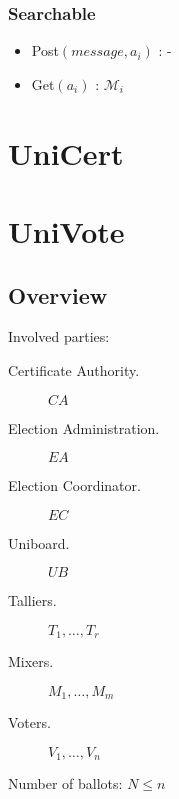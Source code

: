 \documentclass[bibtotoc,halfparskip,oneside]{scrreprt}
\newcommand{\CA}{\ensuremath{\mathit{CA}}\xspace}
\newcommand{\EA}{\ensuremath{\mathit{EA}}\xspace}
\newcommand{\EC}{\ensuremath{\mathit{EC}}\xspace}
\newcommand{\UB}{\ensuremath{\mathit{UB}}\xspace}
\newcommand{\Tallier}[1]{\ensuremath{\mathit{T}_{#1}}\xspace}
\newcommand{\Mixer}[1]{\ensuremath{\mathit{M}_{#1}}\xspace}
\newcommand{\Voter}[1]{\ensuremath{\mathit{V}_{#1}}\xspace}
\begin{document}
\subsection{Searchable}

\begin{itemize}
	\item Post$(message,a_i)$ : -
	\item Get$(a_i)$ : $\mathcal{M}_i$
\end{itemize}

\chapter{UniCert}

\chapter{UniVote}

\section{Overview}

Involved parties:

\begin{description}
	\item[Certificate Authority.] \CA
	\item[Election Administration.] \EA
	\item[Election Coordinator.] \EC
	\item[Uniboard.] \UB
	\item[Talliers.] $\Tallier{1},\ldots,\Tallier{r}$
	\item[Mixers.] $\Mixer{1},\ldots,\Mixer{m}$
	\item[Voters.] $\Voter{1},\ldots,\Voter{n}$
\end{description}

Number of ballots: $N\leq n$
\end{document}
